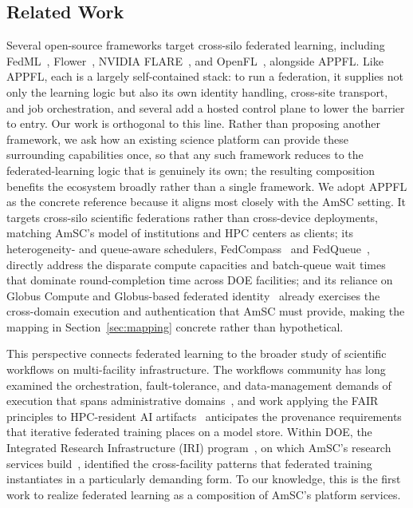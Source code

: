 \documentclass[conference]{IEEEtran}
\begin{document}
\subsection{Related Work}
Several open-source frameworks target cross-silo federated learning, including FedML~\cite{he2020fedml}, Flower~\cite{beutel2020flower}, NVIDIA FLARE~\cite{roth2022nvflare}, and OpenFL~\cite{reina2021openfl}, alongside APPFL. Like APPFL, each is a largely self-contained stack: to run a federation, it supplies not only the learning logic but also its own identity handling, cross-site transport, and job orchestration, and several add a hosted control plane to lower the barrier to entry. Our work is orthogonal to this line. Rather than proposing another framework, we ask how an existing science platform can provide these surrounding capabilities once, so that any such framework reduces to the federated-learning logic that is genuinely its own; the resulting composition benefits the ecosystem broadly rather than a single framework. We adopt APPFL as the concrete reference because it aligns most closely with the AmSC setting. It targets cross-silo scientific federations rather than cross-device deployments, matching AmSC's model of institutions and HPC centers as clients; its heterogeneity- and queue-aware schedulers, FedCompass~\cite{li2024fedcompass} and FedQueue~\cite{li2026fedqueue}, directly address the disparate compute capacities and batch-queue wait times that dominate round-completion time across DOE facilities; and its reliance on Globus Compute and Globus-based federated identity~\cite{chard2020funcx,tuecke2016globus} already exercises the cross-domain execution and authentication that AmSC must provide, making the mapping in Section~\ref{sec:mapping} concrete rather than hypothetical.

This perspective connects federated learning to the broader study of scientific workflows on multi-facility infrastructure. The workflows community has long examined the orchestration, fault-tolerance, and data-management demands of execution that spans administrative domains~\cite{da2021community,da2024workflows}, and work applying the FAIR principles to HPC-resident AI artifacts~\cite{wilkinson2025applying} anticipates the provenance requirements that iterative federated training places on a model store. Within DOE, the Integrated Research Infrastructure (IRI) program~\cite{miller2023integrated}, on which AmSC's research services build~\cite{doe2026scac}, identified the cross-facility patterns that federated training instantiates in a particularly demanding form. To our knowledge, this is the first work to realize federated learning as a composition of AmSC's platform services.
\end{document}
